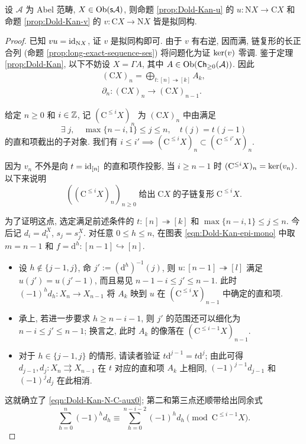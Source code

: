 \begin{theorem}\label{prop:Dold-Kan-N-C}
	设 $\mathcal{A}$ 为 Abel 范畴, $X \in \operatorname{Ob}(\mathsf{s}\mathcal{A})$, 则命题 \ref{prop:Dold-Kan-u} 的 $u: \mathrm{N}X \to \mathrm{C}X$ 和命题 \ref{prop:Dold-Kan-v} 的 $v: \mathrm{C}X \to \mathrm{N}X$ 皆是拟同构.
\end{theorem}
\begin{proof}
	已知 $vu = \mathrm{id}_{\mathrm{N}X}$, 证 $v$ 是拟同构即可. 由于 $v$ 有右逆, 因而满, 链复形的长正合列 (命题 \ref{prop:long-exact-sequence-ses}) 将问题化为证 $\operatorname{ker}(v)$ 零调. 鉴于定理 \ref{prop:Dold-Kan}, 以下不妨设 $X = \Gamma A$, 其中 $A \in \operatorname{Ob}(\mathsf{Ch}_{\geq 0}(\mathcal{A}))$. 因此
	\begin{gather*}
		(\mathrm{C}X)_n = \bigoplus_{t: [n] \twoheadrightarrow [k]} A_k, \\
		\partial_n : (\mathrm{C}X)_n \to (\mathrm{C}X)_{n-1}.
	\end{gather*}
	
	给定 $n \geq 0$ 和 $i \in \mathbb{Z}$, 记 $(\mathrm{C}^{\leq i} X)_n$ 为 $(\mathrm{C}X)_n$ 中由满足
	\[ \exists \; j, \quad \max\{n-i, 1\} \leq j \leq n, \quad t(j) = t(j-1) \]
	的直和项截出的子对象. 我们有 $i \leq i' \implies (\mathrm{C}^{\leq i} X)_n \subset (\mathrm{C}^{\leq i'} X)_n$.

	因为 $v_n$ 不外是向 $t = \mathrm{id}_{[n]}$ 的直和项作投影, 当 $i \geq n-1$ 时 $(\mathrm{C}^{\leq i} X)_n = \operatorname{ker}(v_n)$. 以下来说明
	\begin{equation}\label{eqn:Dold-Kan-N-C-aux0}
		\left( (\mathrm{C}^{\leq i} X)_n \right)_{n \geq 0} \;\text{给出}\; \mathrm{C}X \;\text{的子链复形}\; \mathrm{C}^{\leq i} X.
	\end{equation}

	为了证明这点, 选定满足前述条件的 $t: [n] \twoheadrightarrow [k]$ 和 $\max\{n-i, 1\} \leq j \leq n$. 今后记 $d_i = d_i^X$, $s_j = s_j^X$. 对任意 $0 \leq h \leq n$, 在图表 \eqref{eqn:Dold-Kan-epi-mono} 中取 $m = n-1$ 和 $f = \mathrm{d}^h : [n-1] \hookrightarrow [n]$.
	\begin{itemize}
		\item 设 $h \notin \{j-1, j\}$, 命 $j' := (\mathrm{d}^h)^{-1}(j)$, 则 $u: [n-1] \twoheadrightarrow [l]$ 满足 $u(j') = u(j'-1)$, 而且易见 $n - 1 - i \leq j' \leq n-1$. 此时 $(-1)^h d_h: X_n \to X_{n-1}$ 将 $A_k$ 映到 $u$ 在 $(\mathrm{C}^{\leq i} X)_{n-1}$ 中确定的直和项.
		\item 承上, 若进一步要求 $h \geq n-i-1$, 则 $j'$ 的范围还可以细化为 $n-i \leq j' \leq n-1$; 换言之, 此时 $A_k$ 的像落在 $(\mathrm{C}^{\leq i-1} X)_{n-1}$.
		\item 对于 $h \in \{j-1, j\}$ 的情形, 请读者验证 $t\mathrm{d}^{j-1} = t\mathrm{d}^j$; 由此可得 $d_{j-1}, d_j: X_n \rightrightarrows X_{n-1}$ 在 $t$ 对应的直和项 $A_k$ 上相同, $(-1)^{j-1} d_{j-1}$ 和 $(-1)^j d_j$ 在此相消.
	\end{itemize}
	这就确立了 \eqref{eqn:Dold-Kan-N-C-aux0}; 第二和第三点还顺带给出同余式
	\begin{equation}\label{eqn:Dold-Kan-N-C-aux}
		\sum_{h=0}^n (-1)^h d_h \equiv \sum_{h=0}^{n-i-2} (-1)^h d_h \pmod{ \mathrm{C}^{\leq i-1} X }.
	\end{equation}


\end{proof}
